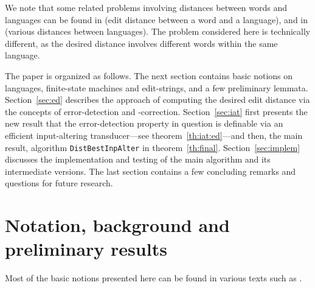 \documentclass{article}
\theoremstyle{plain}
\theoremstyle{definition}
\theoremstyle{remark}
\begin{document}
We note that some related problems involving distances between
words and languages can be found in
\cite{Wag:1974,Pigh:2001} (edit distance between a word and a language), and in
\cite{Mohri:2003,KKPWX:2003,BPR:icalp2011,HKS:dlt2012,HKS:ciaa2013} (various distances between languages).
The problem considered here is technically different,
as the desired distance involves
different words within the same language.

The paper is organized as follows.
The next section contains basic notions
on languages, finite-state machines and edit-strings, and
a few preliminary lemmata.
Section~\ref{sec:ed} describes the approach of
computing the desired edit distance via the concepts
of error-detection and -correction.
Section~\ref{sec:iat} first presents the new result that
the error-detection property in question is definable via
an efficient input-altering transducer---see
theorem~\ref{th:iat:ed}---and then, the main result, algorithm \texttt{DistBestInpAlter} in theorem~\ref{th:final}.
Section~\ref{sec:implem} discusses the implementation
and testing of the main algorithm and its intermediate versions. The last section
contains a few concluding remarks and questions
for future research.




\section{Notation, background and preliminary results}\label{sec:two}
Most of the basic notions presented here can be found
in various texts such as
\cite{Be:1979,Wood:1987,FLhandbookI,Yu:handbook,Sak:2009}.
\end{document}
